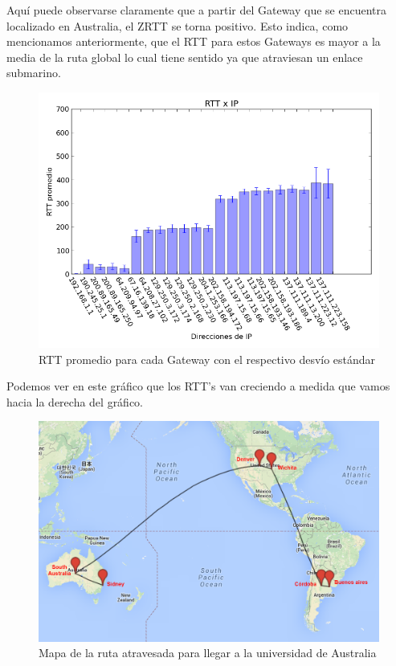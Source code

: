 Aquí puede observarse claramente que a partir del Gateway que se encuentra localizado en Australia, el ZRTT se torna positivo. Esto indica, como mencionamos anteriormente, que el RTT para estos Gateways es mayor a la media de la ruta global lo cual tiene sentido ya que atraviesan un enlace submarino.

\begin{figure}[H]
	\begin{center}
		  \includegraphics[scale=0.5]{../graficos_informe/mq_rtt.png}
		  \caption{RTT promedio para cada Gateway con el respectivo desvío estándar}
		  \label{fig:contra1}
	\end{center}
\end{figure}

Podemos ver en este gráfico que los RTT's van creciendo a medida que vamos hacia la derecha del gráfico.

\begin{figure}[H]
	\begin{center}
		  \includegraphics[scale=0.4]{../mapas/mapa_md.png}
		  \caption{Mapa de la ruta atravesada para llegar a la universidad de Australia}
		  \label{fig:contra1}
	\end{center}
\end{figure}

